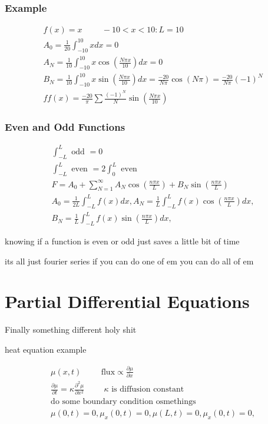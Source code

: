 \documentclass[fleqn]{report}
\newcommand{\hp}{\hspace{1cm}}
\newcommand{\del}{\partial}
\newcommand{\equations} [1] {
\begin{gather*}
#1
\end{gather*}
}
\begin{document}
\subsection{Example}
\equations{
f(x) = x \hp -10 < x < 10 : L = 10
\\
A_0 = \frac{1}{20} \int^{10}_{-10} x dx = 0
\\
A_N = \frac{1}{10} \int^{10}_{-10} x \cos(\frac{N \pi x}{10}) dx = 0
\\
B_N = \frac{1}{10} \int^{10}_{-10} x \sin(\frac{N \pi x}{10}) dx = \frac{-20}{N \pi} \cos(N \pi) = \frac{-20}{N \pi} (-1)^N
\\
ff(x) = \frac{-20}{\pi} \sum \frac{(-1)^N}{N} \sin(\frac{N \pi x}{10})
}

\subsection{Even and Odd Functions}
\equations{
\int^L_{-L} \textrm{ odd } = 0
\\
\int^L_{-L} \textrm{ even } = 2 \int^L_{0} \textrm{ even } 
\\
F = A_0 + \sum^\infty_{N = 1} A_N \cos(\frac{n \pi x}{L}) + B_N \sin(\frac{n \pi x}{L})
\\
A_0 = \frac{1}{2L} \int^L_{-L} f(x) dx, 
A_N = \frac{1}{L} \int^L_{-L} f(x) \cos(\frac{n \pi x}{L}) dx,
\\
B_N = \frac{1}{L} \int^L_{-L} f(x) \sin(\frac{n \pi x}{L}) dx,
}
knowing if a function is even or odd just saves a little bit of time

its all just fourier series if you can do one of em you can do all of em

\chapter{Partial Differential Equations}
Finally something different holy shit

heat equation example
\equations{
\mu(x, t) \hp \textrm{flux} \propto \frac{\del \mu}{\del x}
\\
\frac{\del \mu}{ \del t} = \kappa \frac{\del^2 \mu}{ \del x^2}
\hp
\textrm{$\kappa$ is diffusion constant}
\\
\textrm{do some boundary condition osmethings}
\\
\mu(0, t) = 0, \mu_x(0, t) = 0, \mu(L, t) = 0, \mu_x(0, t) = 0, 
}
\end{document}
